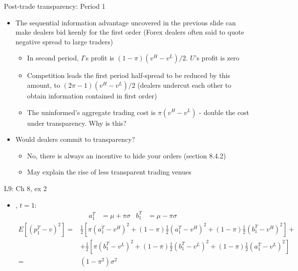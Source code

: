 \documentclass[english,10pt
,aspectratio=169
]{beamer}
\begin{document}
\begin{frame}{Post-trade transparency: Period 1}
	\begin{itemize}
		\item {} The sequential information advantage uncovered in the previous slide can make dealers bid keenly for the first order
		(Forex dealers often said to quote negative spread to large traders)
		\begin{itemize}
			\item In second period, $I$'s profit is $(1-\pi)(v^{H}-v^{L})/2$. $U$'s profit is zero
			\item Competition leads the first period half-spread to be reduced by this amount, to $(2\pi-1)(v^{H}-v^{L})/2$ (dealers undercut each other to obtain information contained in first order)
			\item The uninformed's aggregate trading cost is $\pi(v^{H}-v^{L})$ - double the cost under transparency. Why is this?
		\end{itemize}
		\item Would dealers commit to transparency?
		\begin{itemize}
			\item No, there is always an incentive to hide your orders (section 8.4.2)
			\item May explain the rise of less transparent trading venues
		\end{itemize}
	\end{itemize}
\end{frame}


\begin{frame}{L9: Ch 8, ex 2}
	\begin{itemize}
		\item {}, $t=1$: 
		\begin{align*}
			a_1^T &= \mu + \pi \sigma
			&
			b_1^T &= \mu - \pi \sigma
		\end{align*}
		\begin{align*}
			E\left[ (p_{1}^{T}-v)^{2}\right] =& \frac{1}{2} \left[ \pi(a_1^T-v^H)^2 + (1-\pi)\frac{1}{2}(a_1^T-v^H)^2 + (1-\pi)\frac{1}{2}(b_1^T-v^H)^2 \right] +
			\\
			&+ \frac{1}{2} \left[ \pi(b_1^T-v^L)^2 + (1-\pi)\frac{1}{2}(b_1^T-v^L)^2 + (1-\pi)\frac{1}{2}(a_1^T-v^L)^2 \right]
			\\
			=& (1-\pi^2) \sigma^2
		\end{align*}
	\end{itemize}
\end{frame}
\end{document}
